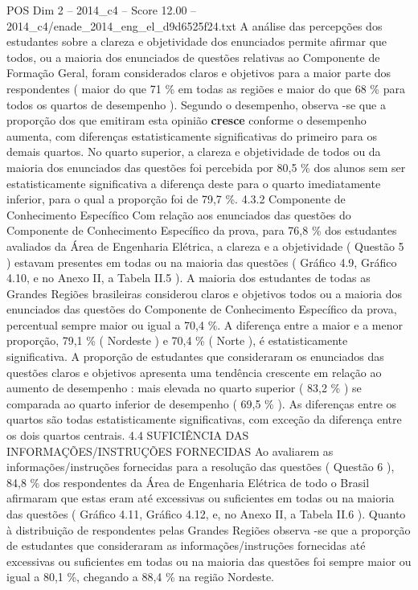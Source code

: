 \begin{textsample}{POS Dim 2 – 2014\_c4 – Score 12.00 – 2014\_c4/enade\_2014\_eng\_el\_d9d6525f24.txt}
A análise das percepções dos estudantes sobre a clareza e objetividade dos enunciados permite afirmar que todos, ou a maioria dos enunciados de questões relativas ao Componente de Formação Geral, foram considerados claros e objetivos para a maior parte dos respondentes ( maior do que 71 \% em todas as regiões e maior do que 68 \% para todos os quartos de desempenho ).
Segundo o desempenho, observa -se que a proporção dos que emitiram esta opinião \textbf{cresce} conforme o desempenho aumenta, com diferenças estatisticamente significativas do primeiro para os demais quartos.
No quarto superior, a clareza e objetividade de todos ou da maioria dos enunciados das questões foi percebida por 80,5 \% dos alunos sem ser estatisticamente significativa a diferença deste para o quarto imediatamente inferior, para o qual a proporção foi de 79,7 \%. 4.3.2 Componente de Conhecimento Específico Com relação aos enunciados das questões do Componente de Conhecimento Específico da prova, para 76,8 \% dos estudantes avaliados da Área de Engenharia Elétrica, a clareza e a objetividade ( Questão 5 ) estavam presentes em todas ou na maioria das questões ( Gráfico 4.9, Gráfico 4.10, e no Anexo II, a Tabela II.5 ).
A maioria dos estudantes de todas as Grandes Regiões brasileiras considerou claros e objetivos todos ou a maioria dos enunciados das questões do Componente de Conhecimento Específico da prova, percentual sempre maior ou igual a 70,4 \%.
A diferença entre a maior e a menor proporção, 79,1 \% ( Nordeste ) e 70,4 \% ( Norte ), é estatisticamente significativa.
A proporção de estudantes que consideraram os enunciados das questões claros e objetivos apresenta uma tendência crescente em relação ao aumento de desempenho : mais elevada no quarto superior ( 83,2 \% ) se comparada ao quarto inferior de desempenho ( 69,5 \% ).
As diferenças entre os quartos são todas estatisticamente significativas, com exceção da diferença entre os dois quartos centrais. 4.4 SUFICIÊNCIA DAS INFORMAÇÕES/INSTRUÇÕES FORNECIDAS Ao avaliarem as informações/instruções fornecidas para a resolução das questões ( Questão 6 ), 84,8 \% dos respondentes da Área de Engenharia Elétrica de todo o Brasil afirmaram que estas eram até excessivas ou suficientes em todas ou na maioria das questões ( Gráfico 4.11, Gráfico 4.12, e, no Anexo II, a Tabela II.6 ).
Quanto à distribuição de respondentes pelas Grandes Regiões observa -se que a proporção de estudantes que consideraram as informações/instruções fornecidas até excessivas ou suficientes em todas ou na maioria das questões foi sempre maior ou igual a 80,1 \%, chegando a 88,4 \% na região Nordeste.

\end{textsample}
